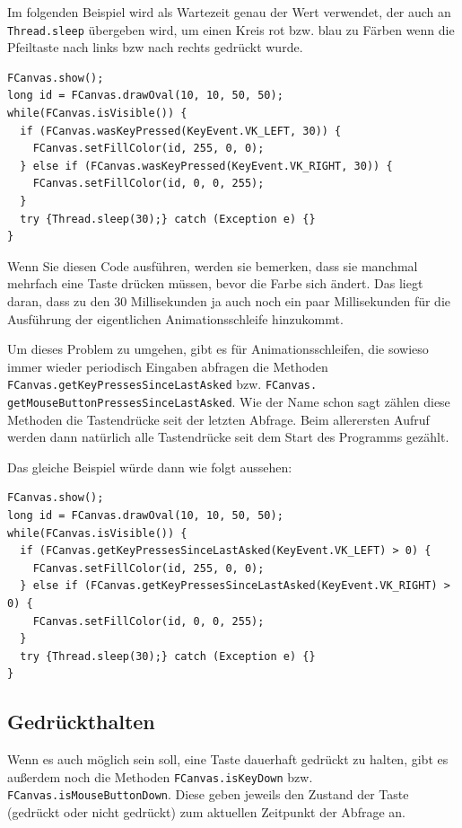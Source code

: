 \documentclass{article}
\begin{document}
Im folgenden Beispiel wird als Wartezeit genau der Wert verwendet, der auch an {\tt Thread.sleep} übergeben wird, um einen Kreis rot bzw. blau zu Färben wenn die Pfeiltaste nach links bzw nach rechts gedrückt wurde.

\begin{lstlisting}
FCanvas.show();
long id = FCanvas.drawOval(10, 10, 50, 50);
while(FCanvas.isVisible()) {
  if (FCanvas.wasKeyPressed(KeyEvent.VK_LEFT, 30)) {
    FCanvas.setFillColor(id, 255, 0, 0);
  } else if (FCanvas.wasKeyPressed(KeyEvent.VK_RIGHT, 30)) {
    FCanvas.setFillColor(id, 0, 0, 255);
  }
  try {Thread.sleep(30);} catch (Exception e) {}
}
\end{lstlisting}

Wenn Sie diesen Code ausführen, werden sie bemerken, dass sie manchmal mehrfach eine Taste drücken müssen, bevor die Farbe sich ändert. Das liegt daran, dass zu den 30 Millisekunden ja auch noch ein paar Millisekunden für die Ausführung der eigentlichen Animationsschleife hinzukommt.

Um dieses Problem zu umgehen, gibt es für Animationsschleifen, die sowieso immer wieder periodisch Eingaben abfragen die Methoden {\tt FCanvas.getKeyPressesSinceLastAsked} bzw. {\tt FCanvas. getMouseButtonPressesSinceLastAsked}. Wie der Name schon sagt zählen diese Methoden die Tastendrücke seit der letzten Abfrage. Beim allerersten Aufruf werden dann natürlich alle Tastendrücke seit dem Start des Programms gezählt.

Das gleiche Beispiel würde dann wie folgt aussehen:
\begin{lstlisting}[basicstyle=\scriptsize\tt]
FCanvas.show();
long id = FCanvas.drawOval(10, 10, 50, 50);
while(FCanvas.isVisible()) {
  if (FCanvas.getKeyPressesSinceLastAsked(KeyEvent.VK_LEFT) > 0) {
    FCanvas.setFillColor(id, 255, 0, 0);
  } else if (FCanvas.getKeyPressesSinceLastAsked(KeyEvent.VK_RIGHT) > 0) {
    FCanvas.setFillColor(id, 0, 0, 255);
  }
  try {Thread.sleep(30);} catch (Exception e) {}
}
\end{lstlisting}

\subsection{Gedrückthalten}
Wenn es auch möglich sein soll, eine Taste dauerhaft gedrückt zu halten, gibt es außerdem noch die Methoden {\tt FCanvas.isKeyDown} bzw. {\tt FCanvas.isMouseButtonDown}. Diese geben jeweils den Zustand der Taste (gedrückt oder nicht gedrückt) zum aktuellen Zeitpunkt der Abfrage an.
\end{document}
